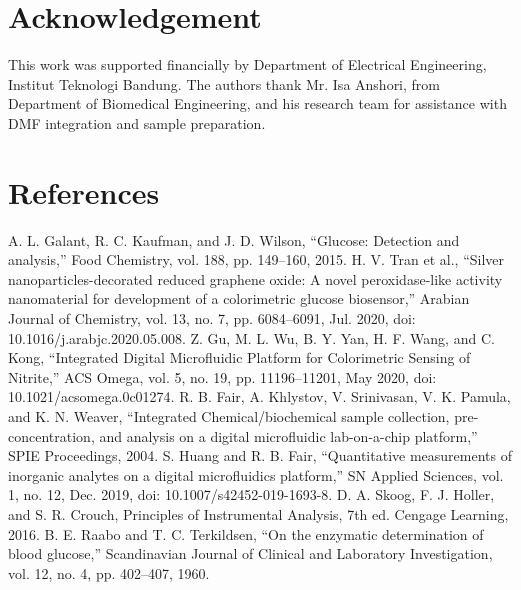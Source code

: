 \documentclass[conference]{IEEEtran}
\begin{document}
\section*{Acknowledgement}
This work was supported financially by Department of Electrical Engineering, Institut Teknologi Bandung.
The authors thank Mr. Isa Anshori, from Department of Biomedical Engineering, and his research team for assistance with DMF integration and sample preparation.

\section*{References}

\begin{thebibliography}{00}
 A. L. Galant, R. C. Kaufman, and J. D. Wilson, “Glucose: Detection and analysis,” Food Chemistry, vol. 188, pp. 149–160, 2015. 
 H. V. Tran et al., “Silver nanoparticles-decorated reduced graphene oxide: A novel peroxidase-like activity nanomaterial for development of a colorimetric glucose biosensor,” Arabian Journal of Chemistry, vol. 13, no. 7, pp. 6084–6091, Jul. 2020, doi: 10.1016/j.arabjc.2020.05.008.
 Z. Gu, M. L. Wu, B. Y. Yan, H. F. Wang, and C. Kong, “Integrated Digital Microfluidic Platform for Colorimetric Sensing of Nitrite,” ACS Omega, vol. 5, no. 19, pp. 11196–11201, May 2020, doi: 10.1021/acsomega.0c01274.
 R. B. Fair, A. Khlystov, V. Srinivasan, V. K. Pamula, and K. N. Weaver, “Integrated Chemical/biochemical sample collection, pre-concentration, and analysis on a digital microfluidic lab-on-a-chip platform,” SPIE Proceedings, 2004. 
 S. Huang and R. B. Fair, “Quantitative measurements of inorganic analytes on a digital microfluidics platform,” SN Applied Sciences, vol. 1, no. 12, Dec. 2019, doi: 10.1007/s42452-019-1693-8.
 D. A. Skoog, F. J. Holler, and S. R. Crouch, Principles of Instrumental Analysis, 7th ed. Cengage Learning, 2016.
 B. E. Raabo and T. C. Terkildsen, “On the enzymatic determination of blood glucose,” Scandinavian Journal of Clinical and Laboratory Investigation, vol. 12, no. 4, pp. 402–407, 1960. 
\end{thebibliography}
\end{document}
